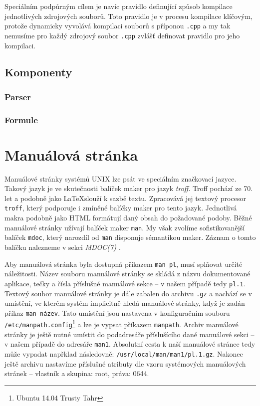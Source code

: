 \documentclass[thesis=B,czech,hidelinks]{FITthesis}[2012/06/26]
\begin{document}
Speciálním podpůrným cílem je navíc pravidlo definující způsob kompilace jednotlivých zdrojových souborů. Toto pravidlo je v procesu kompilace klíčovým, protože dynamicky vyvolává kompilaci souborů s příponou \texttt{.cpp} a my tak nemusíme pro každý zdrojový soubor \texttt{.cpp} zvlášť definovat pravidlo pro jeho kompilaci.

\subsection{Komponenty}

\subsubsection{Parser}

\subsubsection{Formule}

\section{Manuálová stránka}

Manuálové stránky systémů UNIX lze psát ve speciálním značkovací jazyce. Takový jazyk je ve skutečnosti balíček maker pro jazyk \emph{troff}. Troff pochází ze 70. let a podobně jako \LaTeX slouží k sazbě textu. Zpracovává jej textový procesor \texttt{troff}, který podporuje i zmíněné balíčky maker pro tento jazyk\cite{troff}. Jednotlivá makra podobně jako HTML formátují daný obsah do požadované podoby. Běžné manuálové stránky užívají balíček maker \texttt{man}. My však zvolíme sofistikovanější balíček \texttt{mdoc}, který narozdíl od \texttt{man} disponuje sémantikou maker. Záznam o tomto balíčku nalezneme v sekci \emph{MDOC(7) \cite{mdoc}}.

Aby manuálová stránka byla dostupná příkazem \texttt{man pl}, musí splňovat určité náležitosti. Název souboru manuálové stránky se skládá z názvu dokumentované aplikace, tečky a čísla příslušné manuálové sekce -- v našem případě tedy \texttt{pl.1}. Textový soubor manuálové stránky je dále zabalen do archivu \texttt{.gz} a nachází se v umístění, ve kterém systém implicitně hledá manuálové stránky, když je zadán příkaz \texttt{man název}. Tato umístění jsou nastavena v konfiguračním souboru \texttt{/etc/manpath.config}\footnote{Ubuntu 14.04 Trusty Tahr} a lze je vypsat příkazem \texttt{manpath}. Archiv manuálové stránky je ještě nutné umístit do podadresáře příslušícího dané manuálové sekci -- v našem případě do adresáře \texttt{man1}. Absolutní cesta k naší manuálové stránce tedy může vypadat napřklad následovně: \texttt{/usr/local/man/man1/pl.1.gz}. Nakonec ještě archivu nastavíme příslušné atributy dle vzoru systémových manuálových stránek -- vlastník a skupina: root, práva: 0644.
\end{document}
